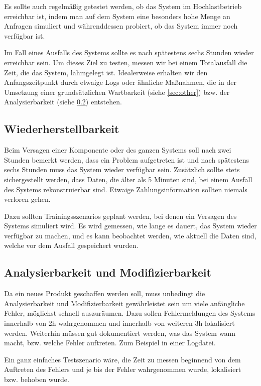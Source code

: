 Es sollte auch regelmäßig getestet werden, ob das System im Hochlastbetrieb erreichbar ist,
indem man auf dem System eine besonders hohe Menge an Anfragen simuliert und währenddessen probiert,
ob das System immer noch verfügbar ist.

Im Fall eines Ausfalls des Systems sollte es nach spätestens sechs Stunden wieder erreichbar sein. Um dieses Ziel zu testen, messen wir bei einem Totalausfall die Zeit, die das System, lahmgelegt ist. Idealerweise erhalten wir den Anfangszeitpunkt durch etwaige Logs oder ähnliche Maßnahmen, die in der Umsetzung einer grundsätzlichen Wartbarkeit (siehe \ref{sec:other}) bzw. der Analysierbarkeit (siehe \ref{sec:anal}) entstehen.

\subsection{Wiederherstellbarkeit}
Beim Versagen einer Komponente oder des ganzen Systems soll nach zwei Stunden bemerkt werden,
dass ein Problem aufgetreten ist und nach spätestens sechs Stunden muss das System wieder verfügbar sein.
Zusätzlich sollte stets sichergestellt werden, dass Daten, die älter als 5 Minuten sind, bei einem Ausfall des Systems rekonstruierbar sind. Etwaige Zahlungsinformation sollten niemals verloren gehen.

Dazu sollten Trainingsszenarios geplant werden, bei denen ein Versagen des Systems simuliert wird.
Es wird gemessen, wie lange es dauert, das System wieder verfügbar zu machen, und es kann beobachtet werden,
wie aktuell die Daten sind, welche vor dem Ausfall gespeichert wurden.


\subsection{Analysierbarkeit und Modifizierbarkeit} \label{sec:anal}
Da ein neues Produkt geschaffen werden soll, muss unbedingt die Analysierbarkeit und Modifizierbarkeit gewährleistet sein um viele anfängliche Fehler, möglichst schnell auszuräumen.
Dazu sollen Fehlermeldungen des Systems innerhalb von 2h wahrgenommen und innerhalb von weiteren 3h lokalisiert werden.
Weiterhin müssen gut dokumentiert werden, was das System wann macht, bzw. welche Fehler auftreten. Zum Beispiel in einer Logdatei.

Ein ganz einfaches Testszenario wäre, die Zeit zu messen beginnend von dem Auftreten des Fehlers und je bis der Fehler wahrgenommen wurde, lokalisiert bzw. behoben wurde.

